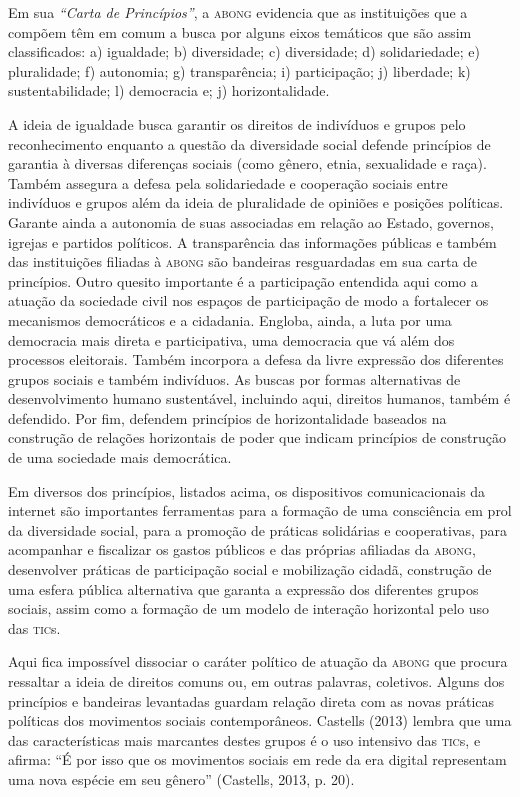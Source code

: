 Em sua \emph{``Carta de Princípios''}, a \textsc{abong} evidencia que as
instituições que a compõem têm em comum a busca por alguns eixos
temáticos que são assim classificados: a) igualdade; b) diversidade; c)
diversidade; d) solidariedade; e) pluralidade; f) autonomia; g)
transparência; i) participação; j) liberdade; k) sustentabilidade; l)
democracia e; j) horizontalidade.

A ideia de igualdade busca garantir os direitos de indivíduos e grupos
pelo reconhecimento enquanto a questão da diversidade social defende
princípios de garantia à diversas diferenças sociais (como gênero,
etnia, sexualidade e raça). Também assegura a defesa pela solidariedade
e cooperação sociais entre indivíduos e grupos além da ideia de
pluralidade de opiniões e posições políticas. Garante ainda a autonomia
de suas associadas em relação ao Estado, governos, igrejas e partidos
políticos. A transparência das informações públicas e também das
instituições filiadas à \textsc{abong} são bandeiras resguardadas em sua carta de
princípios. Outro quesito importante é a participação entendida aqui
como a atuação da sociedade civil nos espaços de participação de modo a
fortalecer os mecanismos democráticos e a cidadania. Engloba, ainda, a
luta por uma democracia mais direta e participativa, uma democracia que
vá além dos processos eleitorais. Também incorpora a defesa da livre
expressão dos diferentes grupos sociais e também indivíduos. As buscas
por formas alternativas de desenvolvimento humano sustentável, incluindo
aqui, direitos humanos, também é defendido. Por fim, defendem princípios
de horizontalidade baseados na construção de relações horizontais de
poder que indicam princípios de construção de uma sociedade mais
democrática.

Em diversos dos princípios, listados acima, os dispositivos
comunicacionais da internet são importantes ferramentas para a formação
de uma consciência em prol da diversidade social, para a promoção de
práticas solidárias e cooperativas, para acompanhar e fiscalizar os
gastos públicos e das próprias afiliadas da \textsc{abong}, desenvolver práticas
de participação social e mobilização cidadã, construção de uma esfera
pública alternativa que garanta a expressão dos diferentes grupos
sociais, assim como a formação de um modelo de interação horizontal pelo
uso das \textsc{tic}s.

Aqui fica impossível dissociar o caráter político de atuação da \textsc{abong}
que procura ressaltar a ideia de direitos comuns ou, em outras palavras,
coletivos. Alguns dos princípios e bandeiras levantadas guardam relação
direta com as novas práticas políticas dos movimentos sociais
contemporâneos. Castells (2013) lembra que uma das características mais
marcantes destes grupos é o uso intensivo das \textsc{tic}s, e afirma: ``É por
isso que os movimentos sociais em rede da era digital representam uma
nova espécie em seu gênero'' (Castells, 2013, p. 20).

